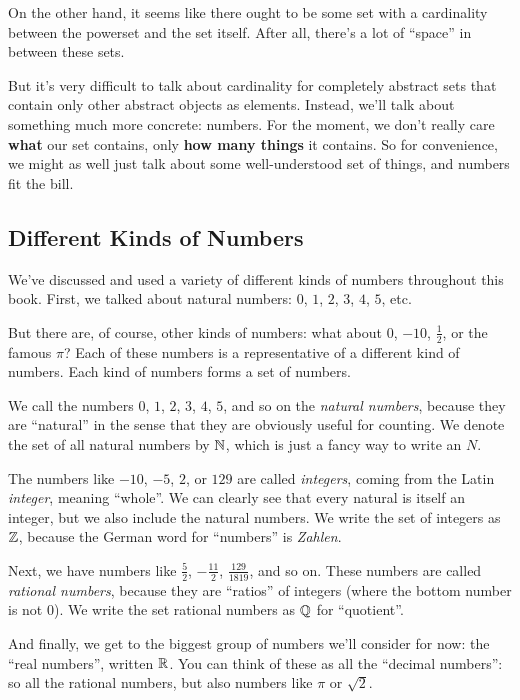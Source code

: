 On the other hand, it seems like there ought to be some set with a cardinality between the powerset and the set itself.
After all, there's a lot of ``space'' in between these sets. 

But it's very difficult to talk about cardinality for completely abstract sets that contain only other abstract objects as elements.
Instead, we'll talk about something much more concrete: numbers.
For the moment, we don't really care \textbf{what} our set contains, only \textbf{how many things} it contains.
So for convenience, we might as well just talk about some well-understood set of things, and numbers fit the bill.

\subsection{Different Kinds of Numbers}

We've discussed and used a variety of different kinds of numbers throughout this book.
First, we talked about natural numbers: $0$, $1$, $2$, $3$, $4$, $5$, etc.

But there are, of course, other kinds of numbers: what about $0$, $-10$, $\frac{1}{2}$, or the famous $\pi$?
Each of these numbers is a representative of a different kind of numbers.
Each kind of numbers forms a set of numbers.

We call the numbers $0$, $1$, $2$, $3$, $4$, $5$, and so on the \emph{natural numbers}, because they are ``natural'' in the sense that they are obviously useful for counting.
We denote the set of all natural numbers by $\mathbb{N}$, which is just a fancy way to write an $N$.

The numbers like $-10$, $-5$, $2$, or $129$ are called \emph{integers}, coming from the Latin \emph{integer}, meaning ``whole''.
We can clearly see that every natural is itself an integer, but we also include the natural numbers.
We write the set of integers as $\mathbb{Z}$, because the German word for ``numbers'' is \emph{Zahlen}.

Next, we have numbers like $\frac{5}{2}$, $-\frac{11}{2}$, $\frac{129}{1819}$, and so on.
These numbers are called \emph{rational numbers}, because they are ``ratios'' of integers (where the bottom number is not $0$).
We write the set rational numbers as $\mathbb{Q}$ for ``quotient''.

And finally, we get to the biggest group of numbers we'll consider for now: the ``real numbers'', written $\mathbb{R}$.
You can think of these as all the ``decimal numbers'': so all the rational numbers, but also numbers like $\pi$ or $\sqrt{2}$. 

